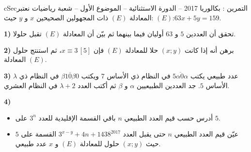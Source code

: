 \documentclass[12pt,a4paper]{article}
\newenvironment{BOX}[2]{\begin{otherlanguage}{english}\begin{arbox}{#1}{#2}}{\end{arbox}\end{otherlanguage}}
\newcounter{exo}
\newenvironment{tamrin}[1]{\stepcounter{exo}\begin{BOX}{cSec}{التمرين \theexo: #1}}{\end{BOX}}
\newenvironment{sq}{\begin{itemize}[leftmargin=2.4em,itemsep=3pt]}{\end{itemize}}
\newcommand{\qa}{\item[(أ)]}\newcommand{\qb}{\item[(ب)]}\newcommand{\qc}{\item[(جـ)]}\newcommand{\qd}{\item[(د)]}\newcommand{\qe}{\item[(هـ)]}
\begin{document}
\begin{tamrin}{بكالوريا 2017 -- الدورة الاستثنائية -- الموضوع الأول -- شعبة رياضيات}
نعتبر المعادلة $(E)$ ذات المجهولين الصحيحين $x$ و $y$ حيث: $(E)$:\quad $63x+5y=159$.

\textbf{1)} تحقق أن العددين $5$ و $63$ أوليان فيما بينهما ثم بيّن أن المعادلة $(E)$ تقبل حلولا.

\textbf{2)} برهن أنه إذا كانت $(x;y)$ حلا للمعادلة $(E)$ فإن $x\equiv3\,[5]$، ثم استنتج حلول المعادلة $(E)$.

\textbf{3)} $\lambda$ عدد طبيعي يكتب $\overline{5\alpha0\alpha}$ في النظام ذي الأساس $7$ ويكتب $\overline{\beta10\beta0}$ في النظام ذي الأساس $5$.
جد العددين الطبيعيين $\alpha$ و $\beta$ ثم أكتب العدد $\lambda+2$ في النظام العشري.

\textbf{4)}
\begin{sq}
\qa أدرس حسب قيم العدد الطبيعي $n$ باقي القسمة الإقليدية للعدد $3^n$ على $5$.
\qb عيّن قيم العدد الطبيعي $n$ حتى يقبل العدد $3^{x-y}+4n+1438^{2017}$ القسمة على $5$ حيث $(x;y)$ حلول للمعادلة $(E)$ و $x$ عدد طبيعي.
\end{sq}
\end{tamrin}
\end{document}
